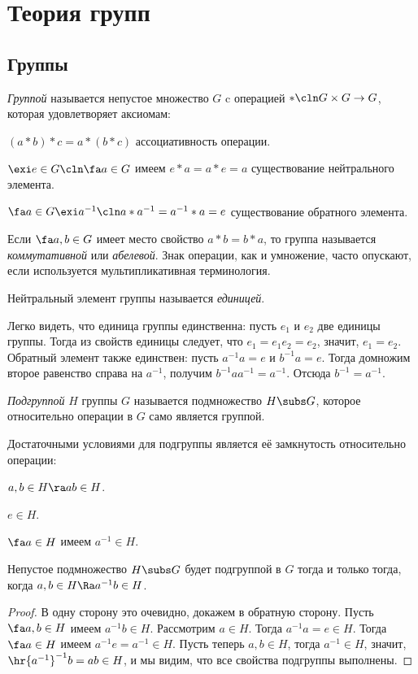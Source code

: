 \documentclass[a4paper]{article}
\begin{document}
\pagebreak

\section{Теория групп}

\subsection{Группы}

\begin{df}
\emph{Группой} называется непустое множество $G$ c операцией $*\cln G \times G \to G$, которая удовлетворяет
аксиомам:

 $(a*b)*c=a*(b*c)$ ассоциативность операции.

 $\exi e \in G\cln \fa a \in G$ имеем $e*a=a*e=a$ существование нейтрального элемента.

 $\fa a \in G \exi a^{-1}\cln a*a^{-1}=a^{-1}*a=e$ существование обратного элемента.

Если $\fa a,b \in G$ имеет место свойство $a*b=b*a$, то группа называется \emph{коммутативной}
или \emph{абелевой}. Знак операции,
как и умножение, часто опускают, если используется мультипликативная терминология.

Нейтральный элемент группы называется \emph{единицей}.
\end{df}

Легко видеть, что единица группы единственна: пусть $e_1$ и $e_2$ две единицы
группы. Тогда из свойств единицы следует, что $e_1 = e_1e_2 =
e_2$, значит, $e_1=e_2$. Обратный элемент также единствен: пусть
$a^{-1}a=e$ и $b^{-1}a=e$. Тогда домножим второе равенство справа
на $a^{-1}$, получим $b^{-1}aa^{-1}=a^{-1}$. Отсюда
$b^{-1}=a^{-1}$.

\begin{df}
\emph{Подгруппой} $H$ группы $G$ называется подмножество $H\subs G$,
которое относительно операции в $G$ само является группой.
\end{df}

Достаточными условиями для подгруппы является её замкнутость
относительно операции:

 $a, b \in H \ra ab \in H$.

 $e \in H$.

 $\fa a \in H$ имеем $a^{-1} \in H$.

\begin{stm}
Непустое подмножество $H \subs G$ будет подгруппой в $G$ тогда и только тогда, когда
$a, b \in H \Ra a^{-1}b \in H$.
\end{stm}
\begin{proof}
В одну сторону это очевидно, докажем в обратную сторону. Пусть $\fa a, b \in H$ имеем $a^{-1}b \in H$. Рассмотрим
$a \in H$. Тогда $a^{-1}a = e \in H$. Тогда $\fa a \in H$ имеем $a^{-1}e = a^{-1} \in H$.
Пусть теперь $a, b \in H$, тогда $a^{-1} \in H$, значит, $\hr{a^{-1}}^{-1}b=ab \in H$, и мы видим,
что все свойства подгруппы выполнены.
\end{proof}
\end{document}
